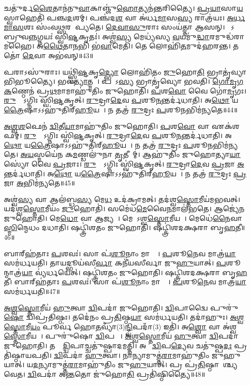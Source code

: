 𑌚𑌤𑍁॑𑌰𑍍𑌦\ul{𑌶𑍈}𑌤𑌾𑌨॑𑌨𑍁\ul{𑌵𑌾}𑌕𑌾𑌞𑍍𑌜𑍁॑\ul{𑌹𑍋}𑌤𑍍𑌯𑌨॑𑌨𑍍𑌤𑌰𑌿𑌤𑍍𑌯𑍈।
\ul{𑌪𑍍𑌰}\ul{𑌯𑌾}𑌸𑌾\ul{𑌯} 𑌸𑍍𑌵𑌾𑌹𑍇𑌤𑌿॑ 𑌪𑌞𑍍𑌚\ul{𑌦}𑌶𑌮𑍍।
𑌪𑌞𑍍𑌚॑𑌦\ul{𑌶} 𑌵𑌾 𑌅॑𑌰𑍍𑌧\ul{𑌮𑌾}𑌸\ul{𑌸𑍍𑌯} 𑌰𑌾𑌤𑍍𑌰॑𑌯𑌃।
\ul{𑌅}\ul{𑌰𑍍𑌧}\ul{𑌮𑌾}\ul{𑌸}𑌶𑌃 𑌸𑌂॑𑌵\ul{𑌥𑍍𑌸}𑌰 𑌆᳚𑌪𑍍𑌯𑌤𑍇।
\ul{𑌦𑍇}\ul{𑌵𑌾}\ul{𑌸𑍁}𑌰𑌾𑌃 𑌸𑌂𑌯॑𑌤𑍍𑌤𑌾 𑌆𑌸𑌨𑍍।
𑌤𑍇᳚𑌽𑌬𑍍𑌰𑍁𑌵\ul{𑌨𑍍𑌨}𑌗𑍍𑌨𑌯𑌃॑ 𑌸𑍍𑌵𑌿\ul{𑌷𑍍𑌟}𑌕𑍃𑌤𑌃॑।
𑌅𑌶𑍍𑌵॑\ul{𑌸𑍍𑌯} 𑌮𑍇𑌧𑍍𑌯॑𑌸𑍍𑌯 \ul{𑌵}𑌯𑌮𑍁॑\ul{𑌦𑍍𑌧𑌾}𑌰𑌮𑍁𑌦𑍍𑌧॑𑌰𑌾𑌮𑌹𑍈।
𑌅\ul{𑌥𑍈}𑌤𑌾\ul{𑌨}𑌭𑌿 𑌭॑\ul{𑌵𑌾}𑌮𑍇𑌤𑌿॑।
𑌤𑍇 𑌲𑍋𑌹𑌿॑\ul{𑌤}𑌮𑍁𑌦॑𑌹𑌰𑌨𑍍𑌤।
𑌤𑌤𑍋॑ \ul{𑌦𑍇}𑌵𑌾 𑌅𑌭॑𑌵𑌨𑍍॥43॥

𑌪𑌰𑌾𑌽𑌸𑍁॑𑌰𑌾𑌃।
𑌯𑌥𑍍𑌸𑍍𑌵𑌿॑\ul{𑌷𑍍𑌟}𑌕𑍃\ul{𑌦𑍍𑌭𑍍𑌯𑍋} 𑌲𑍋𑌹𑌿॑𑌤𑌂 \ul{𑌜𑍁}𑌹𑍋\ul{𑌤𑌿} 𑌭𑍍𑌰𑌾𑌤𑍃॑𑌵𑍍𑌯𑌾𑌭𑌿𑌭𑍂𑌤𑍍𑌯𑍈।
𑌭𑌵॑\ul{𑌤𑍍𑌯𑌾}𑌤𑍍𑌮𑌨𑌾᳚।
𑌪𑌰𑌾᳚𑌽\ul{𑌸𑍍𑌯} 𑌭𑍍𑌰𑌾𑌤𑍃॑𑌵𑍍𑌯𑍋 𑌭𑌵𑌤𑌿।
\ul{𑌗𑍋}\ul{𑌮𑍃}\ul{𑌗}\ul{𑌕}𑌣𑍍𑌠𑍇𑌨॑ 𑌪𑍍𑌰\ul{𑌥}𑌮𑌾𑌮𑌾𑌹𑍁॑𑌤𑌿𑌂 𑌜𑍁𑌹𑍋𑌤𑌿।
\ul{𑌪}𑌶\ul{𑌵𑍋} 𑌵𑍈 𑌗𑍋॑\ul{𑌮𑍃}𑌗𑌃।
\ul{𑌰𑍁}𑌦𑍍𑌰𑍋᳚\-𑌽𑌗𑍍𑌨𑌿𑌃 𑌸𑍍𑌵𑌿॑\ul{𑌷𑍍𑌟}𑌕𑍃𑌤𑍍।
\ul{𑌰𑍁}𑌦𑍍𑌰𑌾\ul{𑌦𑍇}𑌵 \ul{𑌪}𑌶𑍂\ul{𑌨}𑌨𑍍𑌤𑌰𑍍𑌦॑𑌧𑌾𑌤𑌿।
𑌅\ul{𑌥𑍋} 𑌯\ul{𑌤𑍍𑌰𑍈}𑌷𑌾\-𑌽𑌽𑌹𑍁॑𑌤𑌿𑌰𑍍‌\mbox{}\ul{𑌹𑍂}𑌯𑌤𑍇᳚।
𑌨 𑌤𑌤𑍍𑌰॑ \ul{𑌰𑍁}𑌦𑍍𑌰𑌃 \ul{𑌪}𑌶𑍂\ul{𑌨}𑌭𑌿𑌮॑𑌨𑍍𑌯𑌤𑍇॥44॥

\ul{𑌅}\ul{𑌶𑍍𑌵}\ul{𑌶}𑌫𑍇𑌨॑ \ul{𑌦𑍍𑌵𑌿}𑌤𑍀\ul{𑌯𑌾}𑌮𑌾𑌹𑍁॑𑌤𑌿𑌂 𑌜𑍁𑌹𑍋𑌤𑌿।
\ul{𑌪}𑌶\ul{𑌵𑍋} 𑌵𑌾 𑌏𑌕॑𑌶𑌫𑌮𑍍।
\ul{𑌰𑍁}𑌦𑍍𑌰𑍋᳚\-𑌽𑌗𑍍𑌨𑌿𑌃 𑌸𑍍𑌵𑌿॑\ul{𑌷𑍍𑌟}𑌕𑍃𑌤𑍍।
\ul{𑌰𑍁}𑌦𑍍𑌰𑌾\ul{𑌦𑍇}𑌵 \ul{𑌪}𑌶𑍂\ul{𑌨}𑌨𑍍𑌤𑌰𑍍𑌦॑𑌧𑌾𑌤𑌿।
𑌅\ul{𑌥𑍋} 𑌯\ul{𑌤𑍍𑌰𑍈}𑌷𑌾\-𑌽𑌽𑌹𑍁॑𑌤𑌿𑌰𑍍‌\mbox{}\ul{𑌹𑍂}𑌯𑌤𑍇᳚।
𑌨 𑌤𑌤𑍍𑌰॑ \ul{𑌰𑍁}𑌦𑍍𑌰𑌃 \ul{𑌪}𑌶𑍂\ul{𑌨}𑌭𑌿𑌮॑𑌨𑍍𑌯𑌤𑍇।
\ul{𑌅}\ul{𑌯}𑌸𑍍𑌮𑌯𑍇॑𑌨 𑌕\ul{𑌮}𑌣𑍍𑌡𑌲𑍁॑𑌨𑌾 \ul{𑌤𑍃}𑌤𑍀𑌯𑌾᳚𑌮𑍍।
𑌆𑌹𑍁॑𑌤𑌿𑌂 𑌜𑍁𑌹𑍋𑌤𑍍𑌯𑌾\ul{𑌯𑌾}𑌸𑍍𑌯𑍋॑ 𑌵𑍈 \ul{𑌪𑍍𑌰}𑌜𑌾𑌃।
\ul{𑌰𑍁}𑌦𑍍𑌰𑍋᳚\-𑌽𑌗𑍍𑌨𑌿𑌃 𑌸𑍍𑌵𑌿॑\ul{𑌷𑍍𑌟}𑌕𑍃𑌤𑍍।
\ul{𑌰𑍁}𑌦𑍍𑌰𑌾\ul{𑌦𑍇}𑌵 \ul{𑌪𑍍𑌰}𑌜𑌾 \ul{𑌅}𑌨𑍍𑌤𑌰𑍍𑌦॑𑌧𑌾𑌤𑌿।
𑌅\ul{𑌥𑍋} 𑌯\ul{𑌤𑍍𑌰𑍈}𑌷𑌾\-𑌽𑌽𑌹𑍁॑𑌤𑌿𑌰𑍍‌\mbox{}\ul{𑌹𑍂}𑌯𑌤𑍇᳚।
𑌨 𑌤𑌤𑍍𑌰॑ \ul{𑌰𑍁}𑌦𑍍𑌰𑌃 \ul{𑌪𑍍𑌰}𑌜𑌾 \ul{𑌅}𑌭𑌿𑌮॑𑌨𑍍𑌯𑌤𑍇॥45॥\anuvakamend[\ul{𑌦}\ul{𑌧𑌾}𑌤𑍍𑌯𑌭॑𑌵𑌨𑍍𑌮𑌨𑍍𑌯𑌤𑍇 \ul{𑌪𑍍𑌰}𑌜𑌾 \ul{𑌅}𑌨𑍍𑌤𑌰𑍍𑌦॑𑌧𑌾\ul{𑌤𑌿} 𑌦𑍍𑌵𑍇 𑌚॑ ]

𑌅𑌶𑍍𑌵॑\ul{𑌸𑍍𑌯} 𑌵𑌾 𑌆𑌲॑𑌬𑍍𑌧\ul{𑌸𑍍𑌯} 𑌮𑍇\ul{𑌧} 𑌉𑌦॑𑌕𑍍𑌰𑌾𑌮𑌤𑍍।
𑌤𑌦॑𑌶𑍍𑌵\ul{𑌸𑍍𑌤𑍋}𑌮𑍀𑌯॑𑌮𑌭𑌵𑌤𑍍।
𑌯𑌦॑𑌶𑍍𑌵\ul{𑌸𑍍𑌤𑍋}𑌮𑍀𑌯𑌂॑ \ul{𑌜𑍁}𑌹𑍋𑌤𑌿॑।
𑌸𑌮𑍇॑𑌧\ul{𑌮𑍇}𑌵𑍈\ul{𑌨}𑌮𑌾𑌲॑𑌭𑌤𑍇।
𑌆𑌜𑍍𑌯𑍇॑𑌨 𑌜𑍁𑌹𑍋𑌤𑌿।
𑌮𑍇\ul{𑌧𑍋} 𑌵𑌾 𑌆𑌜𑍍𑌯𑌮𑍍᳚।
𑌮𑍇𑌧𑍋᳚\-𑌽𑌶𑍍𑌵\ul{𑌸𑍍𑌤𑍋}𑌮𑍀𑌯𑌮𑍍᳚।
𑌮𑍇𑌧𑍇॑\ul{𑌨𑍈}𑌵𑌾\ul{𑌸𑍍𑌮𑌿}𑌨𑍍𑌮𑍇𑌧𑌂 𑌦𑌧𑌾𑌤𑌿।
𑌷𑌟𑍍𑌤𑍍𑌰𑌿॑𑌶𑌤𑌂 𑌜𑍁𑌹𑍋𑌤𑌿।
𑌷𑌟𑍍𑌤𑍍𑌰𑌿॑𑌶𑌦𑌕𑍍𑌷𑌰𑌾 𑌬𑍃\ul{𑌹}𑌤𑍀॥46॥

𑌬𑌾𑌰𑍍‌\mbox{}𑌹॑𑌤𑌾𑌃 \ul{𑌪}𑌶𑌵𑌃॑।
𑌸𑌾 𑌪॑\ul{𑌶𑍂}𑌨𑌾𑌂 𑌮𑌾𑌤𑍍𑌰𑌾᳚।
\ul{𑌪}𑌶𑍂\ul{𑌨𑍇}𑌵 𑌮𑌾𑌤𑍍𑌰॑\ul{𑌯𑌾} 𑌸𑌮॑𑌰𑍍𑌧𑌯𑌤𑌿।
𑌤𑌾𑌯𑌦𑍍𑌭𑍂𑌯॑𑌸𑍀\ul{𑌰𑍍𑌵𑌾} 𑌕𑌨𑍀॑𑌯𑌸𑍀𑌰𑍍𑌵𑌾 𑌜𑍁\ul{𑌹𑍁}𑌯𑌾𑌤𑍍।
\ul{𑌪}𑌶𑍂𑌨𑍍𑌮𑌾𑌤𑍍𑌰॑\ul{𑌯𑌾} 𑌵𑍍𑌯॑𑌰𑍍𑌧𑌯𑍇𑌤𑍍।
𑌷𑌟𑍍𑌤𑍍𑌰𑌿॑𑌶𑌤𑌂 𑌜𑍁𑌹𑍋𑌤𑌿।
𑌷𑌟𑍍𑌤𑍍𑌰𑌿॑𑌶𑌦𑌕𑍍𑌷𑌰𑌾 𑌬𑍃\ul{𑌹}𑌤𑍀।
𑌬𑌾𑌰𑍍‌\mbox{}𑌹॑𑌤𑌾𑌃 \ul{𑌪}𑌶𑌵𑌃॑।
𑌸𑌾 𑌪॑\ul{𑌶𑍂}𑌨𑌾𑌂 𑌮𑌾𑌤𑍍𑌰𑌾᳚।
\ul{𑌪}𑌶𑍂\ul{𑌨𑍇}𑌵 𑌮𑌾𑌤𑍍𑌰॑\ul{𑌯𑌾} 𑌸𑌮॑𑌰𑍍𑌧𑌯𑌤𑌿॥47॥

\ul{𑌅}\ul{𑌶𑍍𑌵}\ul{𑌸𑍍𑌤𑍋}𑌮𑍀𑌯॑ \ul{𑌹𑍁}𑌤𑍍𑌵𑌾 \ul{𑌦𑍍𑌵𑌿}𑌪𑌦𑌾॑ 𑌜𑍁𑌹𑍋𑌤𑌿।
\ul{𑌦𑍍𑌵𑌿}𑌪𑌾𑌦𑍍𑌵𑍈 𑌪𑍁𑌰𑍁॑\ul{𑌷𑍋} 𑌦𑍍𑌵𑌿𑌪𑍍𑌰॑𑌤𑌿𑌷𑍍𑌠𑌃।
𑌤𑌦𑍇॑𑌨𑌂 𑌪𑍍𑌰\ul{𑌤𑌿}𑌷𑍍𑌠\ul{𑌯𑌾} 𑌸𑌮॑𑌰𑍍𑌧𑌯𑌤𑌿।
𑌤𑌦𑌾॑𑌹𑍁𑌃।
\ul{𑌅}\ul{𑌶𑍍𑌵}\ul{𑌸𑍍𑌤𑍋}𑌮𑍀\ul{𑌯𑌂} 𑌪𑍂𑌰𑍍𑌵॑ 𑌹𑍋\ul{𑌤}𑌵𑍍𑌯𑌾𑌁(3)\ul{𑌨𑍍𑌦𑍍𑌵𑌿}𑌪𑌦𑌾𑌁(3) 𑌇𑌤𑌿॑।
𑌅\ul{𑌶𑍍𑌵𑍋} 𑌵𑌾 𑌅॑𑌶𑍍𑌵\ul{𑌸𑍍𑌤𑍋}𑌮𑍀𑌯𑌮𑍍᳚।
𑌪𑍁𑌰𑍁॑𑌷𑍋 \ul{𑌦𑍍𑌵𑌿}𑌪𑌦𑌾𑌃᳚।
\ul{𑌅}\ul{𑌶𑍍𑌵}\ul{𑌸𑍍𑌤𑍋}𑌮𑍀𑌯॑ \ul{𑌹𑍁}𑌤𑍍𑌵𑌾 \ul{𑌦𑍍𑌵𑌿}𑌪𑌦𑌾॑ 𑌜𑍁𑌹𑍋𑌤𑌿।
𑌤𑌸𑍍𑌮𑌾᳚\ul{𑌦𑍍𑌦𑍍𑌵𑌿}𑌪𑌾𑌚𑍍𑌚𑌤𑍁॑𑌷𑍍𑌪𑌾𑌦𑌮𑌤𑍍𑌤𑌿।
𑌅𑌥𑍋᳚ \ul{𑌦𑍍𑌵𑌿}𑌪\ul{𑌦𑍍𑌯𑍇}𑌵 𑌚𑌤𑍁॑𑌷𑍍𑌪\ul{𑌦𑌃} 𑌪𑍍𑌰𑌤𑌿॑\-𑌷𑍍𑌠𑌾𑌯𑌪𑌤𑌿।
\ul{𑌦𑍍𑌵𑌿}𑌪𑌦𑌾॑ \ul{𑌹𑍁}𑌤𑍍𑌵𑌾।
𑌨𑌾𑌨𑍍𑌯𑌾𑌮𑍁𑌤𑍍𑌤॑\ul{𑌰𑌾}𑌮𑌾𑌹𑍁॑𑌤𑌿𑌂 𑌜𑍁𑌹𑍁𑌯𑌾𑌤𑍍।
𑌯\ul{𑌦}𑌨𑍍𑌯𑌾𑌮𑍁𑌤𑍍𑌤॑\ul{𑌰𑌾}𑌮𑌾𑌹𑍁॑𑌤𑌿𑌂 𑌜𑍁\ul{𑌹𑍁}𑌯𑌾𑌤𑍍।
𑌪𑍍𑌰 𑌪𑍍𑌰॑\ul{𑌤𑌿}𑌷𑍍𑌠𑌾𑌯𑌾᳚𑌶𑍍𑌚𑍍𑌯𑌵𑍇𑌤।
\ul{𑌦𑍍𑌵𑌿}𑌪𑌦𑌾॑ 𑌅\ul{𑌨𑍍𑌤}𑌤𑍋 𑌜𑍁॑𑌹𑍋\ul{𑌤𑌿} 𑌪𑍍𑌰𑌤𑌿॑\-𑌷𑍍𑌠𑌿𑌤𑍍𑌯𑍈॥48॥\anuvakamend[\ul{𑌬𑍃}\ul{𑌹}𑌤𑍍𑌯॑𑌰𑍍𑌧𑌯𑌤𑌿 𑌸𑍍𑌥𑌾𑌪𑌯\ul{𑌤𑌿} 𑌪𑌞𑍍𑌚॑ 𑌚]

